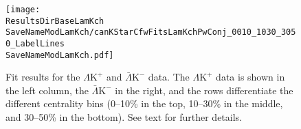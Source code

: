 \documentclass[ALICE,manyauthors]{cernphprep}
\newcommand{\ResultsDirBaseLamKch}{/home/jesse/Analysis/FemtoAnalysis/Results/Results_cLamcKch_20180505/}
\newcommand{\ResultsDirBaseLamKs}{/home/jesse/Analysis/FemtoAnalysis/Results/Results_cLamK0_20180505/}
\newcommand{\MomRes}{_MomResCrctn}%
\newcommand{\NonFlatBgdLamKch}{_NonFlatBgdCrctnLamK0LinearLamKchPolynomial}
\newcommand{\NonFlatBgdLamKs}{_NonFlatBgdCrctnLamK0LinearLamKchPolynomial}
\newcommand{\ResNum}{_3Res}
\newcommand{\PrimMaxDecay}{_PrimMaxDecay10fm}
\newcommand{\ResMethod}{_UsingXiDataAndCoulombOnly}
\newcommand{\ParamFixAndShareLamKch}{_ShareLam_Dualie_ShareLam_ShareRadii}
\newcommand{\ParamFixAndShareLamKs}{_ShareLam_Dualie_ShareLam_ShareRadii}
\newcommand{\SaveNameModLamKch}{\MomRes\NonFlatBgdLamKch\ResNum\PrimMaxDecay\ResMethod\ParamFixAndShareLamKch}
\newcommand{\SaveNameModLamKs}{\MomRes\NonFlatBgdLamKs\ResNum\PrimMaxDecay\ResMethod\ParamFixAndShareLamKs}
\newcommand{\LamK}{$\Lambda$K\xspace}
\newcommand{\LamKchP}{$\Lambda\mathrm{K^{+}}$\xspace}
\newcommand{\ALamKchM}{$\bar{\Lambda}\mathrm{K^{-}}$\xspace}
\newcommand{\LamKchPALamKchM}{$\Lambda\mathrm{K^{+}}$($\bar{\Lambda}\mathrm{K^{-}}$)\xspace}
\newcommand{\LamKchMALamKchP}{$\Lambda\mathrm{K^{-}}$($\bar{\Lambda}\mathrm{K^{+}}$)\xspace}
\newcommand{\LamKsALamKs}{$\Lambda\mathrm{K^{0}_{S}}$($\bar{\Lambda}\mathrm{K^{0}_{S}}$)\xspace}
\begin{document}
\begin{comment}
\begin{figure}[htp]
  \centering
  \subfigure[\LamKchPALamKchM]{
    \label{fig:LamKFits_3Res:a}
    \texttt{[image: \\ResultsDirBaseLamKch\\SaveNameModLamKch/canKStarCfwFitsLamKchPwConj\_0010\_1030\_3050\_LabelLines\\SaveNameModLamKch.pdf]}}
  \subfigure[\LamKchMALamKchP]{
    \label{fig:LamKFits_3Res:b}
    \texttt{[image: \\ResultsDirBaseLamKch\\SaveNameModLamKch/canKStarCfwFitsLamKchMwConj\_0010\_1030\_3050\_LabelLines\\SaveNameModLamKch.pdf]}}
  \\  
  \subfigure[\LamKsALamKs]{
    \label{fig:LamKFits_3Res:c}
    \texttt{[image: \\ResultsDirBaseLamKs\\SaveNameModLamKs/canKStarCfwFitsLamK0wConj\_0010\_1030\_3050\_LabelLines\\SaveNameModLamKs.pdf]}}    
  \caption{Fits, with 3 residual correlations included, for all \LamK analyses across all studied centralities (0--10\%, 10--30\%, and 30--50\%).
 The lines represent the statistical errors, while the boxes represent the systematic errors.
 The black solid line represents the primary (\LamK) correlation's contribution to the fit.  
 The green line shows the fit to the non-flat background.
 The purple points show the fit after all residuals' contributions have been included, and momentum resolution and non-flat background corrections have been applied.
 The extracted fit values with uncertainties are printed.}  
  \label{fig:LamKFits_3Res}
\end{figure}
\end{comment}

\begin{figure}[h]
  \centering
  \texttt{[image: \\ResultsDirBaseLamKch\\SaveNameModLamKch/canKStarCfwFitsLamKchPwConj\_0010\_1030\_3050\_LabelLines\\SaveNameModLamKch.pdf]}
  \caption[\LamKchPALamKchM data with fits]
  {
  Fit results for the \LamKchP and \ALamKchM data.
  The \LamKchP data is shown in the left column, the \ALamKchM in the right, and the rows differentiate the different centrality bins (0--10\% in the top, 10--30\% in the middle, and 30--50\% in the bottom).
  See text for further details.
  }
  \label{fig:LamKchPwConjFits_3Res}
\end{figure}
\end{document}

